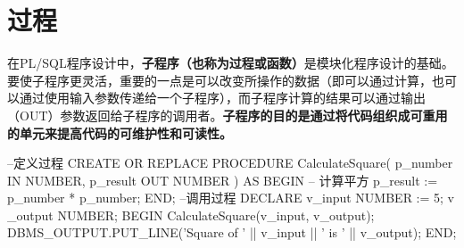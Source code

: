\documentclass[11pt, a4paper, oneside, UTF8]{ctexbook}
\let\kaishu\relax %
\begin{document}
\chapter{过程}
在PL/SQL程序设计中，{\bfseries\kaishu 子程序（也称为过程或函数）}是模块化程序设计的基础。要使子程序更灵活，重要的一点是可以改变所操作的数据（即可以通过计算，也可以通过使用输入参数传递给一个子程序），而子程序计算的结果可以通过输出（OUT）参数返回给子程序的调用者。{\bfseries\kaishu 子程序的目的是通过将代码组织成可重用的单元来提高代码的可维护性和可读性。}

\begin{plsql}[caption=子程序示例]
--定义过程
CREATE OR REPLACE PROCEDURE CalculateSquare(
  p_number IN NUMBER,
  p_result OUT NUMBER
) AS
BEGIN
  -- 计算平方
  p_result := p_number * p_number;
END;
--调用过程
DECLARE
  v_input NUMBER := 5;
v _output NUMBER;
BEGIN
  CalculateSquare(v_input, v_output);
  DBMS_OUTPUT.PUT_LINE('Square of ' || v_input || ' is ' || v_output);
END;
\end{plsql}

\end{document}
